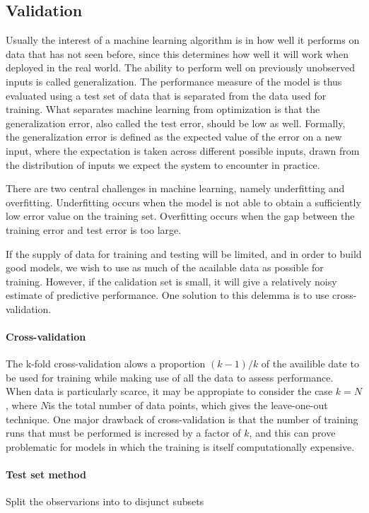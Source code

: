 \documentclass{scrartcl}
\begin{document}
\subsection{Validation}

Usually the interest of a machine learning algorithm is in how well it performs on data that has not seen before, since this determines how well it will work when deployed in the real world. The ability to perform well on previously unobserved inputs is called generalization. The performance measure of the model is thus evaluated using a test set of data that is separated from the data used for training. What separates machine learning from optimization is that the generalization error, also called the test error, should be low as well. Formally, the generalization error is defined as the expected value of the error on a new input, where the expectation is taken across different possible inputs, drawn from the distribution of inputs we expect the system to encounter in practice.

There are two central challenges in machine learning, namely underfitting and overfitting. Underfitting occurs when the model is not able to obtain a sufficiently low error value on the training set. Overfitting occurs when the gap between the training error and test error is too large.

If the supply of data for training and testing will be limited, and in order to build good models, we wish to use as much of the acailable data as possible for training. However, if the calidation set is small, it will give a relatively noisy estimate of predictive performance. One solution to this delemma is to use cross-validation.

\paragraph{Cross-validation}  The k-fold cross-validation alows a proportion $(k-1)/k$ of the availible date to be used for training while making use of all the data to assess performance. When data is particularly scarce, it may be appropiate to consider the case $k=N$, where $N $is the total number of data points, which gives the leave-one-out technique. One major drawback of cross-validation is that the number of training runs that must be performed is incresed by a factor of $k$, and this can prove problematic for models in which the training is itself computationally expensive.

\paragraph{Test set method} Split the observarions into to disjunct subsets 
\end{document}
